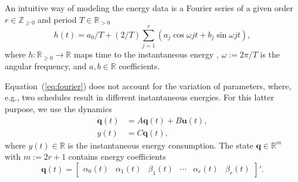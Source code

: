 \documentclass[letterpaper,10pt,journal,twoside]{IEEEtran}
\theoremstyle{definition}
\begin{document}


An intuitive way of modeling the energy data is a Fourier series of a given order $r\in\mathbb{Z}_{\geq 0}$ and period $T\in\mathbb{R}_{>0}$
\begin{equation}\label{eq:fourier}
  h(t)=a_0/T+(2/T)\sum_{j=1}^{r}{\left(a_j\cos{\omega jt}+b_j\sin{\omega jt}\right)},
\end{equation}
where $h:\mathbb{R}_{\geq 0}\rightarrow\mathbb{R}$ maps time to the instantaneous energy%
, $\omega:=2\pi/T$ is the angular frequency, and $a,b\in\mathbb{R}$ %
coefficients.

Equation~(\ref{eq:fourier}) does not account for the variation of parameters, where, e.g., two schedules result in different instantaneous energies.
For this latter purpose, we use the dynamics %
\begin{subequations}\label{eq:state-perf}
  \begin{align}
  \dot{\mathbf{q}}(t)&=A\mathbf{q}(t)+B\mathbf{u}(t),\label{eq:state-perf-q}\\
  y(t)&=C\mathbf{q}(t),\label{eq:state-perf-y}
\end{align}
\end{subequations}
where $y(t)\in\mathbb{R}$ is the instantaneous energy consumption. The state $\mathbf{q}\in\mathbb{R}^m$ with $m:=2r+1$ contains energy coefficients
\begin{equation}
  \mathbf{q}(t)=\begin{bmatrix}
    \alpha_0(t) & \alpha_1(t) & \beta_1(t) & \cdots & \alpha_r(t) & \beta_r(t)
  \end{bmatrix}'.
\end{equation}
\end{document}
